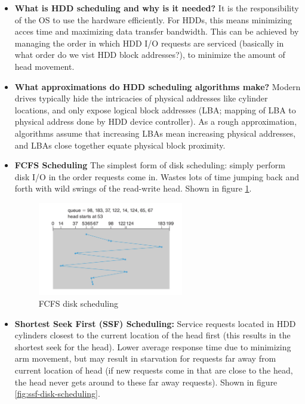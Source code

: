 \documentclass[12pt]{article}
\begin{document}
\begin{itemize}
    \item \textbf{What is HDD scheduling and why is it needed?} It is the responsibility of the OS to use the hardware efficiently. For HDDs, this means minimizing acces time and maximizing data transfer bandwidth. This can be achieved by managing the order in which HDD I/O requests are serviced (basically in what order do we vist HDD block addresses?), to minimize the amount of head movement.
    \item \textbf{What approximations do HDD scheduling algorithms make?} Modern drives typically hide the intricacies of physical addresses like cylinder locations, and only expose logical block addresses (LBA; mapping of LBA to physical address done by HDD device controller). As a rough approximation, algorithms assume that increasing LBAs mean increasing physical addresses, and LBAs close together equate physical block proximity.
    \item \textbf{FCFS Scheduling} The simplest form of disk scheduling: simply perform disk I/O in the order requests come in. Wastes lots of time jumping back and forth with wild swings of the read-write head. Shown in figure \ref{fig:fcfs-disk-scheduling}.
        \begin{figure}[ht]
            \centering
            \includegraphics[width=0.6\textwidth]{figures/fcfs-disk-scheduling.jpg}
            \caption{FCFS disk scheduling}
            \label{fig:fcfs-disk-scheduling}
        \end{figure}
    \item \textbf{Shortest Seek First (SSF) Scheduling:} Service requests located in HDD cylinders closest to the current location of the head first (this results in the shortest seek for the head). Lower average response time due to minimizing arm movement, but may result in starvation for requests far away from current location of head (if new requests come in that are close to the head, the head never gets around to these far away requests). Shown in figure \ref{fig:ssf-disk-scheduling}.

\end{itemize}
\end{document}
